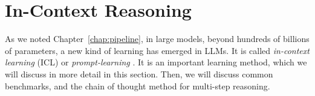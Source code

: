 \section{In-Context Reasoning}\label{sec:reasoning}
As we noted Chapter~\ref{chap:pipeline}, in large models, beyond hundreds of billions of parameters, a new kind of learning has emerged in LLMs. It is called {\em in-context learning} (ICL) or  {\em prompt-learning} \citep{brown2020language}. It is an important learning method, which we will discuss in more detail in this section. 
Then, we will discuss common benchmarks, and the chain of thought method for multi-step reasoning.


